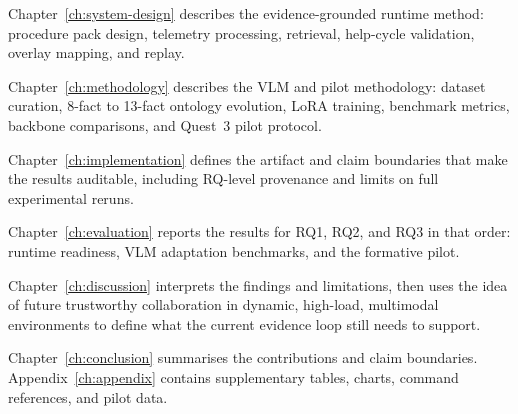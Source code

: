 Chapter~\ref{ch:system-design} describes the evidence-grounded runtime method:
procedure pack design, telemetry processing, retrieval, help-cycle validation,
overlay mapping, and replay.

Chapter~\ref{ch:methodology} describes the VLM and pilot methodology:
dataset curation, 8-fact to 13-fact ontology evolution, LoRA training,
benchmark metrics, backbone comparisons, and Quest~3 pilot protocol.

Chapter~\ref{ch:implementation} defines the artifact and claim boundaries that
make the results auditable, including RQ-level provenance and limits on full
experimental reruns.

Chapter~\ref{ch:evaluation} reports the results for RQ1, RQ2, and RQ3 in that
order: runtime readiness, VLM adaptation benchmarks, and the formative pilot.

Chapter~\ref{ch:discussion} interprets the findings and limitations, then
uses the idea of future trustworthy collaboration in dynamic, high-load,
multimodal environments to define what the current evidence loop still needs
to support.

Chapter~\ref{ch:conclusion} summarises the contributions and claim boundaries.
Appendix~\ref{ch:appendix} contains supplementary tables, charts, command
references, and pilot data.
